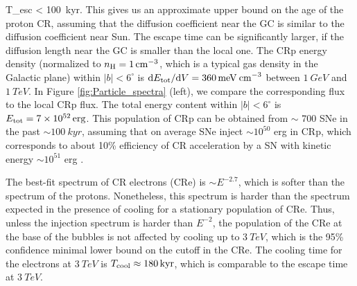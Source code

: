 \be
T_{\rm esc} <  \approx \SI{100}{kyr}.
\ee
This gives us an approximate upper bound on the age of the proton CR, 
assuming that the diffusion coefficient near the GC is similar to the diffusion coefficient near Sun.
The escape time can be significantly larger, if the diffusion length near the GC is smaller than the local one.
The CRp energy density (normalized to $n_{\text{H}} = \SI{1}{cm^{-3}}$, which is a typical gas density in the Galactic plane) 
within $|b| < 6^\circ$ is 
$\text{d} E_{\text{tot}} / \text{d} V = \SI{360}{meV\: cm^{-3}}$ between $\SI{1}{GeV}$ and $\SI{1}{TeV}$.
In Figure \ref{fig:Particle_spectra} (left), we compare the corresponding flux to the local CRp flux.
The total energy content within $|b| < 6^\circ$ is $E_{\text{tot}} = \SI{7e52}{erg}$.
This population of CRp can be obtained from $\sim$ 700 SNe in the past $\sim \SI{100}{kyr}$, 
assuming that on average SNe inject $\sim 10^{50}$ erg in CRp, which corresponds to about 10\% efficiency
of CR acceleration by a SN with kinetic energy $\sim 10^{51}$ erg \citep[e.g.,][]{Spurio2015}.

The best-fit spectrum of CR electrons (CRe) is $\sim E^{-2.7}$, which is softer than the spectrum of the protons.
Nonetheless, this spectrum is harder than the spectrum expected in the presence of cooling
for a stationary population of CRe.
Thus, unless the injection spectrum is harder than $E^{-2}$, the population of the CRe at the base of the 
bubbles is not affected by cooling up to $\SI{3}{TeV}$,
which is the 95\% confidence minimal lower bound on the cutoff in the CRe. 
The cooling time for the electrons at %
$\SI{3}{TeV}$ is $T_{\rm cool} \approx \SI{180}{kyr}$,
which is comparable to the escape time at $\SI{3}{TeV}$.

